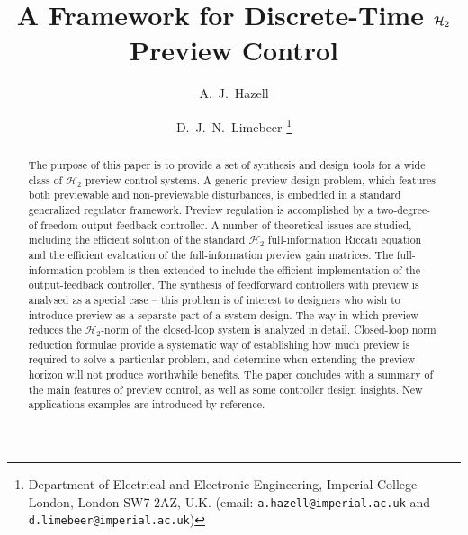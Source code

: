\documentclass[a4paper,12pt]{article}
\title{\LARGE \bf A Framework for Discrete-Time $\htwo$ Preview Control}
\author{A.~J.~Hazell \and D.~J.~N.~Limebeer%
\thanks{Department of Electrical and Electronic Engineering, Imperial College London, London SW7 2AZ, U.K. (email: \texttt{a.hazell@imperial.ac.uk} and \texttt{d.limebeer@imperial.ac.uk})}%
}
\theoremstyle{remark}
\newcommand{\htwo}{\mathcal H_2}
\begin{document}
\date{}
\maketitle

\linespread{2}
\selectfont


\begin{abstract}
\label{sec:Abstract}
The purpose of this paper is to provide a set of synthesis and design tools for a wide class of $\htwo$ preview control systems. A generic preview design problem, which features both previewable and non-previewable disturbances,  is embedded in a standard generalized regulator framework. Preview regulation is accomplished by a two-degree-of-freedom output-feedback controller. A number of theoretical issues are studied, including the efficient solution of the standard $\htwo$ full-information Riccati equation and the efficient evaluation of the full-information preview gain matrices. The full-information problem is then extended to include the efficient implementation of the output-feedback controller. The synthesis of feedforward controllers with preview is analysed as a special case -- this problem is of interest to designers who wish to introduce preview as a separate part of a system design. The way in which preview reduces the $\htwo$-norm of the closed-loop system is analyzed in detail. Closed-loop norm reduction formulae provide a systematic way of establishing how much preview is required to solve a particular problem, and determine when extending the preview horizon will not produce worthwhile benefits. The paper concludes with a summary of the main features of preview control, as well as some controller design insights. New applications examples are introduced by reference. 
\end{abstract}


\begin{center}
\begin{minipage}{0.7\columnwidth}
\small

\normalsize 
\end{minipage}
\end{center}
\end{document}
